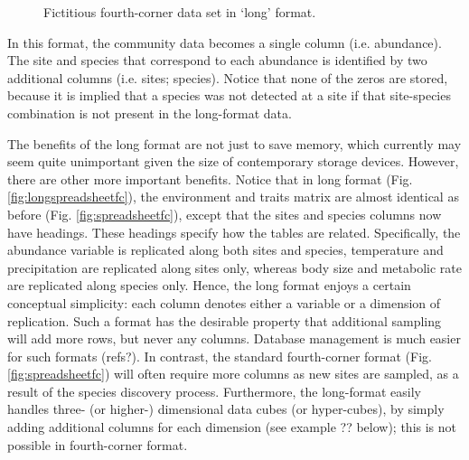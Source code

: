 \documentclass{article}
\numberwithin{exercise}{section}
\begin{document}
\begin{figure}
\caption{Fictitious fourth-corner data set in `long' format.}
\end{figure}In this format, the community data becomes a single column (i.e. abundance).  The site and species that correspond to each abundance is identified by two additional columns (i.e. sites; species).  Notice that none of the zeros are stored, because it is implied that a species was not detected at a site if that site-species combination is not present in the long-format data.

The benefits of the long format are not just to save memory, which currently may seem quite unimportant given the size of contemporary storage devices.  However, there are other more important benefits.  Notice that in long format (Fig. \ref{fig:longspreadsheetfc}), the environment and traits matrix are almost identical as before (Fig. \ref{fig:spreadsheetfc}), except that the sites and species columns now have headings.  These headings specify how the tables are related.  Specifically, the abundance variable is replicated along both sites and species, temperature and precipitation are replicated along sites only, whereas body size and metabolic rate are replicated along species only.  Hence, the long format enjoys a certain conceptual simplicity:  each column denotes either a variable or a dimension of replication.  Such a format has the desirable property that additional sampling will add more rows, but never any columns.  Database management is much easier for such formats (refs?).  In contrast, the standard fourth-corner format (Fig. \ref{fig:spreadsheetfc}) will often require more columns as new sites are sampled, as a result of the species discovery process.  Furthermore, the long-format easily handles three- (or higher-) dimensional data cubes (or hyper-cubes), by simply adding additional columns for each dimension (see example ?? below); this is not possible in fourth-corner format.
\end{document}
